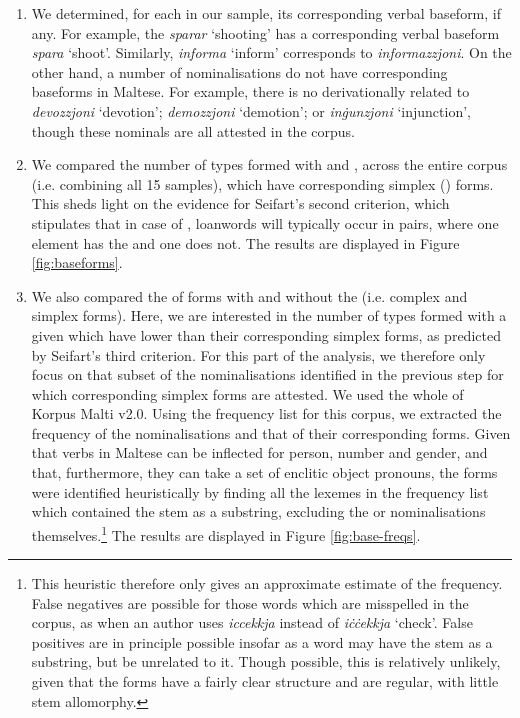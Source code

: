 \documentclass[output=paper]{LSP/langsci}
\begin{document}
\begin{enumerate}
\item We determined, for each  in our sample, its corresponding verbal baseform, if any. For example, the  \textit{sparar} `shooting' has a corresponding verbal baseform \textit{spara} `shoot'. Similarly, \textit{informa} `inform' corresponds to \textit{informazzjoni}. On the other hand, a number of nominalisations do not have corresponding baseforms in Maltese. For example, there is no  derivationally related to \textit{devozzjoni} `devotion'; \textit{demozzjoni} `demotion'; or \textit{inġunzjoni} `injunction', though these nominals are all attested in the corpus. 
\item We compared the number of types formed with {\zjoni} and \ar, across the entire corpus (i.e. combining all 15 samples), which have corresponding simplex () forms. This sheds light on the evidence for Seifart's second criterion, which stipulates that in case of , loanwords will typically occur in pairs, where one element has the  and one does not. The results are displayed in Figure \ref{fig:baseforms}.
\item We also compared the  of forms with and without the  (i.e. complex and simplex  forms). Here, we are interested in the number of types formed with a given  which have lower  than their corresponding simplex forms, as predicted by Seifart's third criterion. For this part of the analysis, we therefore only focus on that subset of the nominalisations identified in the previous step for which corresponding simplex forms are attested. We used the whole of Korpus Malti v2.0. Using the frequency list for this corpus, we extracted the frequency of the nominalisations and that of their corresponding  forms. Given that verbs in Maltese can be inflected for person, number and gender, and that, furthermore, they can take a set of enclitic object pronouns, the  forms were identified heuristically by finding all the lexemes in the frequency list which contained the  stem as a substring, excluding the {\ar} or {\zjoni} nominalisations themselves.\footnote{This heuristic therefore only gives an approximate estimate of the  frequency. False negatives are possible for those words which are misspelled in the corpus, as when an author uses \textit{iccekkja} instead of \textit{iċċekkja} `check'. False positives are in principle possible insofar as a word may have the  stem as a substring, but be unrelated to it. Though possible, this is relatively unlikely, given that the  forms have a fairly clear structure and are regular, with little stem allomorphy.} The results are displayed in Figure \ref{fig:base-freqs}.
\end{enumerate}
\end{document}
